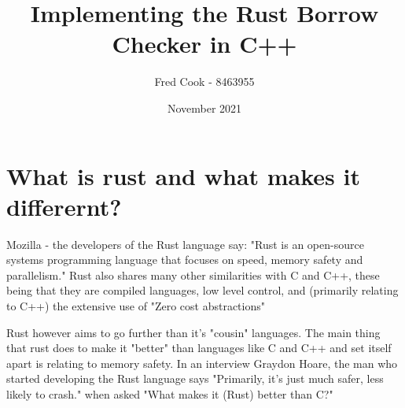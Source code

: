 \documentclass{article}
\title{Implementing the Rust Borrow Checker in C++}
\author{Fred Cook - 8463955}
\date{November 2021}
\begin{document}
\maketitle
\newpage


\tableofcontents
\newpage



\listoftables
{}
\listoffigures


\printglossary[type=\acronymtype, title=List of acronyms]


\newpage


\section{What is rust and what makes it differernt?}
Mozilla - the developers of the Rust language say: "Rust is an open-source systems programming language that focuses on speed, memory safety and parallelism."  Rust also shares many other similarities with C and C++, these being that they are compiled languages, low level control, and (primarily relating to C++) the extensive use of "Zero cost abstractions" \parencite{mozilla-rust}

Rust however aims to go further than it's "cousin" languages. The main thing that rust does to make it "better" than languages like C and C++ and set itself apart is relating to memory safety. In an interview Graydon Hoare, the man who started developing the Rust language says "Primarily, it's just much safer, less likely to crash." when asked "What makes it (Rust) better than C?" \parencite{rust-interview}
\end{document}
